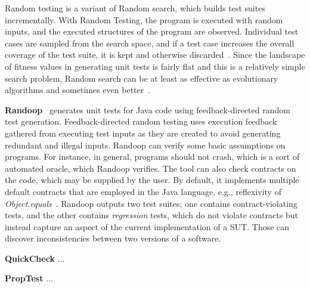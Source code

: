 \documentclass{article}
\begin{document}

Random testing is a variant of Random search, which builds test suites incrementally. With Random Testing, the program is executed with random inputs, and the executed structures of the program are observed. Individual test cases are sampled from the search space, and if a test case increases the overall coverage of the test suite, it is kept and otherwise discarded~\cite{Campos2017}. Since the landscape of fitness values in generating unit tests is fairly flat and this is a relatively simple search problem, Random search can be at least as effective as evolutionary algorithms and sometimes even better~\cite{Shamshiri2015a}.

\textbf{Randoop}~\cite{Pacheco_2007} generates unit tests for Java code using feedback-directed random test generation. Feedback-directed random testing uses execution feedback gathered from executing test inputs as they are created to avoid generating redundant and illegal inputs. Randoop can verify some basic assumptions on programs. For instance, in general, programs should not crash, which is a sort of automated oracle, which Randoop verifies. The tool can also check  contracts on the code, which may be supplied by the user. By default, it implements multiple default contracts that are employed in the Java language, e.g., reflexivity of \textit{Object.equals}~\cite{Fraser2013}. Randoop outputs two test suites; one contains contract-violating tests, and the other contains \textit{regression} tests, which do not violate contracts but instead capture an aspect of the current implementation of a \ac{SUT}. Those can discover inconsistencies between two versions of a software.

\textbf{QuickCheck} ...

\textbf{PropTest} ...

\end{document}
